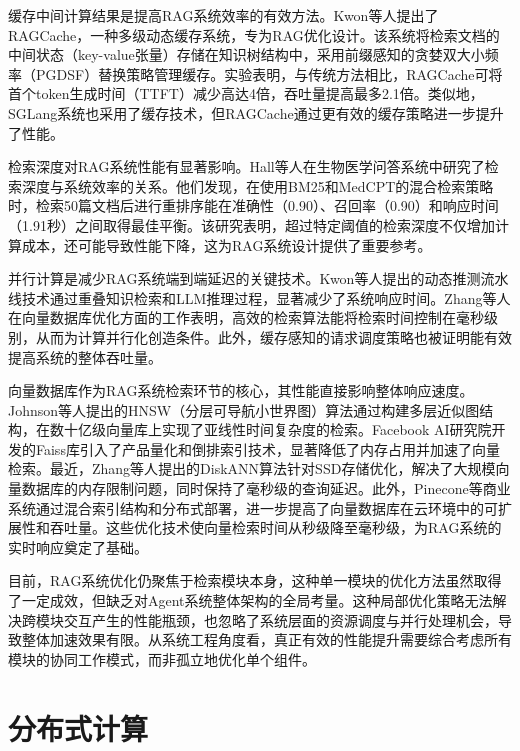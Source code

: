 缓存中间计算结果是提高RAG系统效率的有效方法。Kwon等人\cite{jin2024ragcacheefficientknowledgecaching}提出了RAGCache，一种多级动态缓存系统，专为RAG优化设计。该系统将检索文档的中间状态（key-value张量）存储在知识树结构中，采用前缀感知的贪婪双大小频率（PGDSF）替换策略管理缓存。实验表明，与传统方法相比，RAGCache可将首个token生成时间（TTFT）减少高达4倍，吞吐量提高最多2.1倍。类似地，SGLang系统也采用了缓存技术，但RAGCache通过更有效的缓存策略进一步提升了性能。

检索深度对RAG系统性能有显著影响。Hall等人\cite{stuhlmann2025efficientreproduciblebiomedicalquestion}在生物医学问答系统中研究了检索深度与系统效率的关系。他们发现，在使用BM25和MedCPT的混合检索策略时，检索50篇文档后进行重排序能在准确性（0.90）、召回率（0.90）和响应时间（1.91秒）之间取得最佳平衡。该研究表明，超过特定阈值的检索深度不仅增加计算成本，还可能导致性能下降，这为RAG系统设计提供了重要参考。

并行计算是减少RAG系统端到端延迟的关键技术。Kwon等人\cite{jin2024ragcacheefficientknowledgecaching}提出的动态推测流水线技术通过重叠知识检索和LLM推理过程，显著减少了系统响应时间。Zhang等人\cite{295471}在向量数据库优化方面的工作表明，高效的检索算法能将检索时间控制在毫秒级别，从而为计算并行化创造条件。此外，缓存感知的请求调度策略也被证明能有效提高系统的整体吞吐量\cite{zhang2022bufferpoolawarequery}。

向量数据库作为RAG系统检索环节的核心，其性能直接影响整体响应速度。Johnson等人\cite{10.1109/TPAMI.2018.2889473}提出的HNSW（分层可导航小世界图）算法通过构建多层近似图结构，在数十亿级向量库上实现了亚线性时间复杂度的检索。Facebook AI研究院开发的Faiss库\cite{douze2025faisslibrary}引入了产品量化和倒排索引技术，显著降低了内存占用并加速了向量检索。最近，Zhang等人\cite{NEURIPS2019_09853c7f}提出的DiskANN算法针对SSD存储优化，解决了大规模向量数据库的内存限制问题，同时保持了毫秒级的查询延迟。此外，Pinecone等商业系统通过混合索引结构和分布式部署，进一步提高了向量数据库在云环境中的可扩展性和吞吐量。这些优化技术使向量检索时间从秒级降至毫秒级，为RAG系统的实时响应奠定了基础。

目前，RAG系统优化仍聚焦于检索模块本身，这种单一模块的优化方法虽然取得了一定成效，但缺乏对Agent系统整体架构的全局考量。这种局部优化策略无法解决跨模块交互产生的性能瓶颈，也忽略了系统层面的资源调度与并行处理机会，导致整体加速效果有限。从系统工程角度看，真正有效的性能提升需要综合考虑所有模块的协同工作模式，而非孤立地优化单个组件。


\section{分布式计算}

